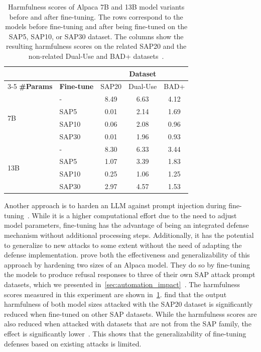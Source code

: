 \begin{table}[htb]
    \centering
    \caption{Harmfulness scores of Alpaca 7B and 13B model variants before and after fine-tuning. The rows correspond to the models before fine-tuning and after being fine-tuned on the SAP5, SAP10, or SAP30 dataset. The columns show the resulting harmfulness scores on the related SAP20 and the non-related Dual-Use and BAD+ datasets~\cite{deng_attack_2023}.}
    \label{tab:fine_tune_defense}
    \begin{tabular}{@{}llccc@{}}
        \toprule
         & & \multicolumn{3}{c}{\textbf{Dataset}} \\
        \cmidrule{3-5}
        \textbf{\#Params} & \textbf{Fine-tune} & SAP20 & Dual-Use & BAD+ \\
        \midrule
        \multirow{4}{*}{7B}     & -     & 8.49  & 6.63  & 4.12 \\
                                & SAP5  & 0.01  & 2.14  & 1.69 \\
                                & SAP10 & 0.06  & 2.08  & 0.96 \\
                                & SAP30 & 0.01  & 1.96  & 0.93 \\
        \midrule
        \multirow{4}{*}{13B}    & -     & 8.30  & 6.33  & 3.44 \\
                                & SAP5  & 1.07  & 3.39  & 1.83 \\
                                & SAP10 & 0.25  & 1.06  & 1.25 \\
                                & SAP30 & 2.97  & 4.57  & 1.53 \\
        \bottomrule
    \end{tabular}
\end{table}

Another approach is to harden an LLM against prompt injection during fine-tuning~\cite{deng_attack_2023, chen_defending_nodate}.
While it is a higher computational effort due to the need to adjust model parameters, fine-tuning has the advantage of being an integrated defense mechanism without additional processing steps.
Additionally, it has the potential to generalize to new attacks to some extent without the need of adapting the defense implementation.
\deng prove both the effectiveness and generalizability of this approach by hardening two sizes of an Alpaca model.
They do so by fine-tuning the models to produce refusal responses to three of their own SAP attack prompt datasets, which we presented in~\cref{sec:automation_impact}~\cite{deng_attack_2023}.
The harmfulness scores measured in this experiment are shown in~\cref{tab:fine_tune_defense}.
\deng find that the output harmfulness of both model sizes attacked with the SAP20 dataset is significantly reduced when fine-tuned on other SAP datasets.
While the harmfulness scores are also reduced when attacked with datasets that are not from the SAP family, the effect is significantly lower~\cite{deng_attack_2023}.
This shows that the generalizability of fine-tuning defenses based on existing attacks is limited.\\

